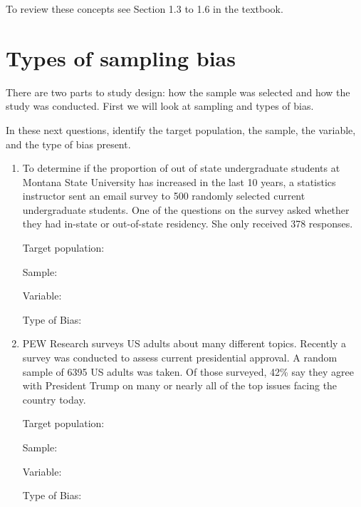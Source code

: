 \documentclass[
]{report}
\begin{document}
To review these concepts see Section 1.3 to 1.6 in the textbook.

\newpage

\hypertarget{types-of-sampling-bias}{%
\section{Types of sampling bias}\label{types-of-sampling-bias}}

There are two parts to study design: how the sample was selected and how the study was conducted. First we will look at sampling and types of bias.

In these next questions, identify the target population, the sample, the variable, and the type of bias present.

\begin{enumerate}
\def\labelenumi{\arabic{enumi}.}
\item
  To determine if the proportion of out of state undergraduate students at Montana State University has increased in the last 10 years, a statistics instructor sent an email survey to 500 randomly selected current undergraduate students. One of the questions on the survey asked whether they had in-state or out-of-state residency. She only received 378 responses.
  \vspace{0.25in}

  Target population:
  \vspace{0.3in}

  Sample:
  \vspace{0.3in}

  Variable:
  \vspace{0.3in}

  Type of Bias:
  \vspace{0.3in}
\item
  PEW Research surveys US adults about many different topics. Recently a survey was conducted to assess current presidential approval. A random sample of 6395 US adults was taken. Of those surveyed, 42\% say they agree with President Trump on many or nearly all of the top issues facing the country today.
  \vspace{0.25in}

  Target population:
  \vspace{0.3in}

  Sample:
  \vspace{0.3in}

  Variable:
  \vspace{0.3in}

  Type of Bias:
  \vspace{0.3in}
\end{enumerate}
\end{document}
